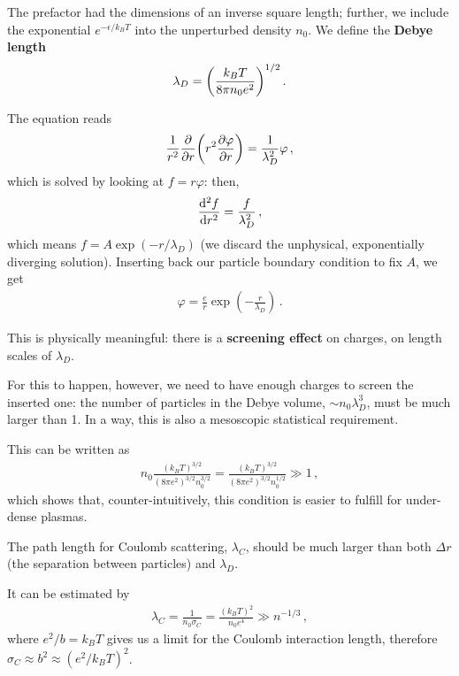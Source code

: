 \documentclass[main.tex]{subfiles}
\begin{document}
The prefactor had the dimensions of an inverse square length; further, we include the exponential \(e^{- \epsilon / k_BT}\) into the unperturbed density \(n_0 \).
We define the \textbf{Debye length}
%
\begin{align}
\lambda _D = \qty(\frac{k_B T}{8 \pi n_0 e^2})^{1/2}
\,.
\end{align}

The equation reads 
%
\begin{align}
\frac{1}{r^2} \pdv{r} \qty(r^2 \pdv{\varphi }{r}) 
= \frac{1}{\lambda _D^2} \varphi 
\,,
\end{align}
%
which is solved by looking at \(f = r \varphi \): then, 
%
\begin{align}
\dv[2]{f}{r} = \frac{f}{\lambda _D^2}
\,,
\end{align}
%
which means \(f = A \exp(- r / \lambda _D)\) (we discard the unphysical, exponentially diverging solution). 
Inserting back our particle boundary condition to fix \(A\), we get 
%
\begin{align}
\varphi = \frac{e}{r} \exp(- \frac{r}{\lambda _D})
\,.
\end{align}

This is physically meaningful: there is a \textbf{screening effect} on charges, on length scales of \(\lambda _D\). 

For this to happen, however, we need to have enough charges to screen the inserted one: the number of particles in the Debye volume, \(\sim n_0 \lambda _D^3\), must be much larger than 1. 
In a way, this is also a mesoscopic statistical requirement. 

This can be written as 
%
\begin{align}
n_0 \frac{(k_BT)^{3/2}}{( 8 \pi e^2)^{3/2} n_0^{3/2}} 
= \frac{(k_BT)^{3/2}}{( 8 \pi e^2)^{3/2} n_0^{1/2}} 
\gg 1
\,,
\end{align}
%
which shows that, counter-intuitively, this condition is easier to fulfill for under-dense plasmas. 

The path length for Coulomb scattering, \(\lambda _C\), should be much larger than both \(\Delta r\) (the separation between particles) and \(\lambda _D\). 

It can be estimated by 
%
\begin{align}
\lambda _C = \frac{1}{n_0 \sigma _C} = \frac{(k_B T)^2}{n_0 e^{4}} \gg n^{-1/3} 
\,,
\end{align}
%
where \(e^2 / b = k_B T\) gives us a limit for the Coulomb interaction length, therefore \(\sigma _C \approx b^2 \approx (e^2 / k_B T)^2\). 
\end{document}
